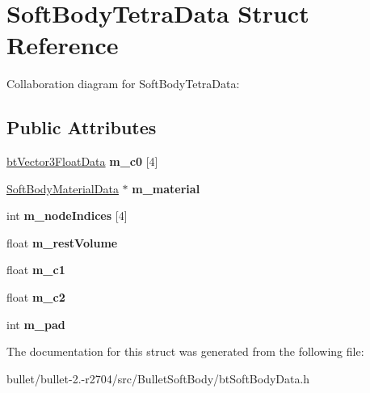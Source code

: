 \hypertarget{struct_soft_body_tetra_data}{\section{Soft\+Body\+Tetra\+Data Struct Reference}
\label{struct_soft_body_tetra_data}
}


Collaboration diagram for Soft\+Body\+Tetra\+Data\+:
\subsection*{Public Attributes}
\begin{DoxyCompactItemize}
\item 
\hypertarget{struct_soft_body_tetra_data_a627747b5daf322851f14ad7c79ac6ac2}{\hyperlink{structbt_vector3_float_data}{bt\+Vector3\+Float\+Data} {\bfseries m\+\_\+c0} \mbox{[}4\mbox{]}}\label{struct_soft_body_tetra_data_a627747b5daf322851f14ad7c79ac6ac2}

\item 
\hypertarget{struct_soft_body_tetra_data_a650259aff31d2dc62a4fc860f2b1a5c2}{\hyperlink{struct_soft_body_material_data}{Soft\+Body\+Material\+Data} $\ast$ {\bfseries m\+\_\+material}}\label{struct_soft_body_tetra_data_a650259aff31d2dc62a4fc860f2b1a5c2}

\item 
\hypertarget{struct_soft_body_tetra_data_a2412381cc83582b0ceaecd1893694ca9}{int {\bfseries m\+\_\+node\+Indices} \mbox{[}4\mbox{]}}\label{struct_soft_body_tetra_data_a2412381cc83582b0ceaecd1893694ca9}

\item 
\hypertarget{struct_soft_body_tetra_data_aabca833d1e9377c1ca76fae6aee7ff39}{float {\bfseries m\+\_\+rest\+Volume}}\label{struct_soft_body_tetra_data_aabca833d1e9377c1ca76fae6aee7ff39}

\item 
\hypertarget{struct_soft_body_tetra_data_a7dde8f8ceedaff75f33752241875595e}{float {\bfseries m\+\_\+c1}}\label{struct_soft_body_tetra_data_a7dde8f8ceedaff75f33752241875595e}

\item 
\hypertarget{struct_soft_body_tetra_data_ad810c00250737ca383b0dae52523015d}{float {\bfseries m\+\_\+c2}}\label{struct_soft_body_tetra_data_ad810c00250737ca383b0dae52523015d}

\item 
\hypertarget{struct_soft_body_tetra_data_a3ea4579e1958520489cde140e5f7c442}{int {\bfseries m\+\_\+pad}}\label{struct_soft_body_tetra_data_a3ea4579e1958520489cde140e5f7c442}

\end{DoxyCompactItemize}


The documentation for this struct was generated from the following file\+:\begin{DoxyCompactItemize}
\item 
bullet/bullet-\/2.-\/r2704/src/\+Bullet\+Soft\+Body/bt\+Soft\+Body\+Data.\+h\end{DoxyCompactItemize}
